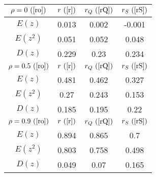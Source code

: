 \begin{tabular}{|c|c|c|c|}
\hline
$\rho = 0~(\ref{ro})$ & $r ~(\ref{r})$ & $r_Q ~(\ref{rQ})$ & $r_S ~(\ref{rS})$\\
\hline
$E(z)$ & 0.013 & 0.002 & -0.001\\
\hline
$E(z^2)$ & 0.051 & 0.052 & 0.048\\
\hline
$D(z)$ & 0.229 & 0.23 & 0.234\\
\hline
$\rho = 0.5~(\ref{ro})$ & $r ~(\ref{r})$ & $r_Q ~(\ref{rQ})$ & $r_S ~(\ref{rS})$\\
\hline
$E(z)$ & 0.481 & 0.462 & 0.327\\
\hline
$E(z^2)$ & 0.27 & 0.243 & 0.153\\
\hline
$D(z)$ & 0.185 & 0.195 & 0.22\\
\hline
$\rho = 0.9~(\ref{ro})$ & $r ~(\ref{r})$ & $r_Q ~(\ref{rQ})$ & $r_S ~(\ref{rS})$\\
\hline
$E(z)$ & 0.894 & 0.865 & 0.7\\
\hline
$E(z^2)$ & 0.803 & 0.758 & 0.498\\
\hline
$D(z)$ & 0.049 & 0.07 & 0.165\\
\hline
\end{tabular}